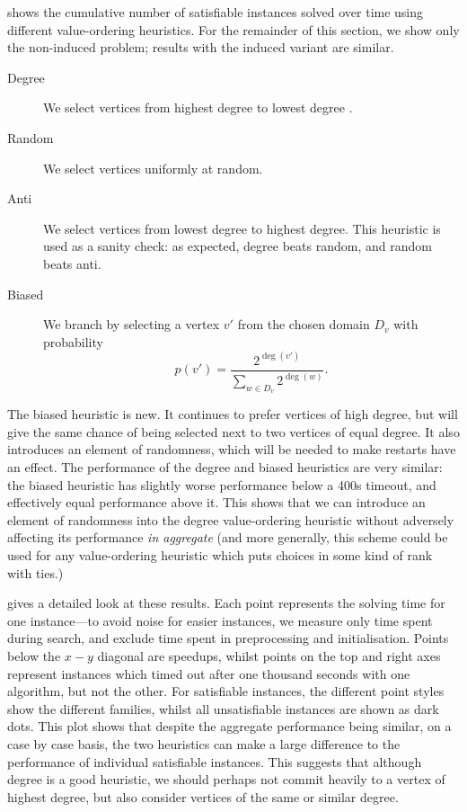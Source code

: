 \documentclass[letterpaper]{article} %
\begin{document}
 shows the cumulative number of satisfiable instances
solved over time using different value-ordering heuristics. For the remainder of this section, we
show only the non-induced problem; results with the induced variant are similar.

\begin{description}
\item[Degree] We select vertices from highest degree to lowest degree
\cite{DBLP:conf/ijcai/McCreeshPT16}.

\item[Random] We select vertices uniformly at random.

\item[Anti] We select vertices from lowest degree to highest degree. This heuristic is used as
a sanity check: as expected, degree beats random, and random beats anti.

\item[Biased] We branch by selecting a vertex $v'$ from the chosen domain $D_v$ with
probability \[ p(v') = \frac{2^{\deg(v')}}{\sum_{w \in D_v}{2^{\deg(w)}}} \text{.} \]\end{description}

\noindent
The biased heuristic is new. It continues to prefer vertices of high degree, but will give the same
chance of being selected next to two vertices of equal degree.  It also introduces an element of
randomness, which will be needed to make restarts have an effect.  The performance of the degree and
biased heuristics are very similar: the biased heuristic has slightly worse performance below a 400s
timeout, and effectively equal performance above it. This shows that we can introduce an element of
randomness into the degree value-ordering heuristic without adversely affecting its performance
\emph{in aggregate} (and more generally, this scheme could be used for any value-ordering
heuristic which puts choices in some kind of rank with ties.)

 gives a detailed look at these results.  Each point represents the
solving time for one instance---to avoid noise for easier instances, we measure only time spent
during search, and exclude time spent in preprocessing and initialisation.  Points below the $x-y$
diagonal are speedups, whilst points on the top and right axes represent instances which timed out
after one thousand seconds with one algorithm, but not the other. For satisfiable instances, the
different point styles show the different families, whilst all unsatisfiable instances are shown as
dark dots.  This plot shows that despite the aggregate performance being similar, on a case by case
basis, the two heuristics can make a large difference to the performance of individual satisfiable
instances. This suggests that although degree is a good heuristic, we should perhaps not commit
heavily to a vertex of highest degree, but also consider vertices of the same or similar degree.
\end{document}
